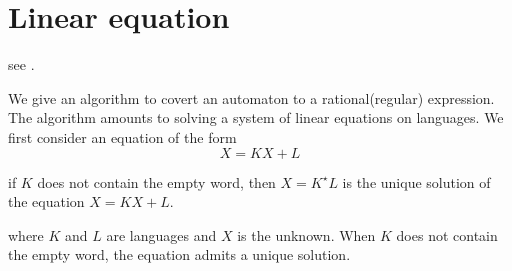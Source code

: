\section{Linear equation}

see \cite[5.3,p64]{Jean2018}.

We give an algorithm to covert an automaton to a rational(regular) expression. The algorithm amounts to solving a system of linear equations on languages. We first consider an equation of the form
\begin{equation}\label{Linear equation}
X = KX + L
\end{equation}

\begin{proposition}
	if $K$ does not contain the empty word, then $X = K^\star L$ is the unique solution of the equation $X = KX + L$.
\end{proposition}
where $K$ and $L$ are languages and $X$ is the unknown. When $K$ does not contain the empty word, the equation admits a unique solution.

